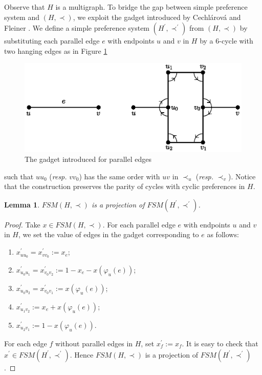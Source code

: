 \documentclass[11pt]{article}
\newtheorem{lemma}[theorem]{Lemma}
\numberwithin{theorem}{section}
\begin{document}
Observe that $H$ is a multigraph.
To bridge the gap between simple preference system and $(H,\prec)$,
we exploit the gadget introduced by Cechl\'{a}rov\'{a} and Fleiner \cite{CechFlei05}.
We define a simple preference system $(H^\prime,\prec^\prime)$ from $(H,\prec)$
by substituting each parallel edge $e$ with endpoints $u$ and $v$ in $H$ by a $6$-cycle with two hanging edges as in Figure \ref{gadget}
\begin{figure}
\centering
  \includegraphics[width=.65\linewidth]{KernelMengerian-gadget}
  \caption{The gadget introduced for parallel edges}
  \label{gadget}
\end{figure}
such that $u u_0$ (\textit{resp.} $v v_0$) has the same order with $u v$ in $\prec_u$ (\textit{resp.} $\prec_v$).
Notice that the construction preserves the parity of cycles with cyclic preferences in $H$.

\begin{lemma}
\label{lem:reduct1}
$FSM(H,\prec)$ is a projection of $FSM(H^\prime,\prec^\prime)$.
\end{lemma}
\begin{proof}
Take $x\in FSM(H,\prec)$.
For each parallel edge $e$ with endpoints $u$ and $v$ in $H$,
we set the value of edges in the gadget corresponding to $e$ as follows:
\begin{enumerate}[label={(\alph*)}, itemsep=0.2mm]
  \item $x^\prime_{u u_0}=x^\prime_{v v_0}:=x_{e}$;
  \item $x^\prime_{u_0 u_1}=x^\prime_{v_0 v_2}:=1-x_{e}-x(\varphi_u(e))$;
  \item $x^\prime_{u_0 u_2}=x^\prime_{v_0 v_1}:=x(\varphi_u (e))$;
  \item $x^\prime_{u_1 v_2}:=x_e +x(\varphi_u (e))$;
  \item $x^\prime_{u_2 v_1}:=1-x(\varphi_u (e))$.
\end{enumerate}
For each edge $f$ without parallel edges in $H$, set $x^\prime_f:=x_f$.
It is easy to check that $x^\prime\in FSM(H^\prime, \prec^\prime)$.
Hence $FSM(H,\prec)$ is a projection of $FSM(H^\prime,\prec^\prime)$.
\end{proof}
\end{document}
